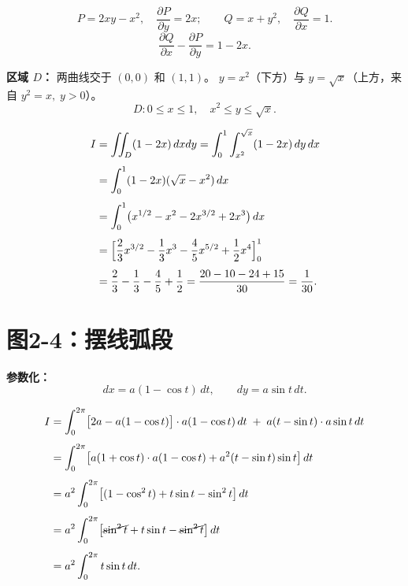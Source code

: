 \documentclass[12pt,a4paper]{ctexart}
\newcommand{\answerbox}[1]{%
  \begin{center}
  \fbox{\color{red}\large\bfseries #1}
  \end{center}
}
\begin{document}
\[
P = 2xy - x^2,\quad \frac{\partial P}{\partial y} = 2x;\qquad
Q = x + y^2,\quad \frac{\partial Q}{\partial x} = 1.
\]
\[
\frac{\partial Q}{\partial x} - \frac{\partial P}{\partial y} = 1 - 2x.
\]

\noindent\textbf{区域 $D$：} 两曲线交于 $(0,0)$ 和 $(1,1)$。
$y=x^2$（下方）与 $y=\sqrt{x}$（上方，来自 $y^2=x,\;y>0$）。
\[
D: 0 \leq x \leq 1,\quad x^2 \leq y \leq \sqrt{x}.
\]

\[
\begin{aligned}
I &= \iint_D (1-2x)\,dxdy
   = \int_0^1 \int_{x^2}^{\sqrt{x}} (1-2x)\,dy\,dx \\[4pt]
  &= \int_0^1 (1-2x)(\sqrt{x} - x^2)\,dx \\[4pt]
  &= \int_0^1 \bigl(x^{1/2} - x^2 - 2x^{3/2} + 2x^3\bigr)\,dx \\[4pt]
  &= \Bigl[\frac{2}{3}x^{3/2} - \frac{1}{3}x^3 - \frac{4}{5}x^{5/2} + \frac{1}{2}x^4\Bigr]_0^1 \\[4pt]
  &= \frac{2}{3} - \frac{1}{3} - \frac{4}{5} + \frac{1}{2}
   = \frac{20-10-24+15}{30}
   = \frac{1}{30}.
\end{aligned}
\]

\answerbox{$I = \dfrac{1}{30}$}

\newpage
\section{图2-4：摆线弧段}


\bigskip

\noindent\textbf{参数化：}
\[
dx = a(1-\cos t)\,dt,\qquad dy = a\sin t\,dt.
\]

\[
\begin{aligned}
I &= \int_0^{2\pi} \bigl[2a - a(1-\cos t)\bigr] \cdot a(1-\cos t)\,dt
    \;+\; a(t-\sin t) \cdot a\sin t\,dt \\[4pt]
  &= \int_0^{2\pi} \bigl[a(1+\cos t) \cdot a(1-\cos t) + a^2(t-\sin t)\sin t\bigr]\,dt \\[4pt]
  &= a^2\int_0^{2\pi} \bigl[(1-\cos^2 t) + t\sin t - \sin^2 t\bigr]\,dt \\[4pt]
  &= a^2\int_0^{2\pi} \bigl[\cancel{\sin^2 t} + t\sin t - \cancel{\sin^2 t}\bigr]\,dt \\[4pt]
  &= a^2\int_0^{2\pi} t\sin t\,dt.
\end{aligned}
\]
\end{document}
